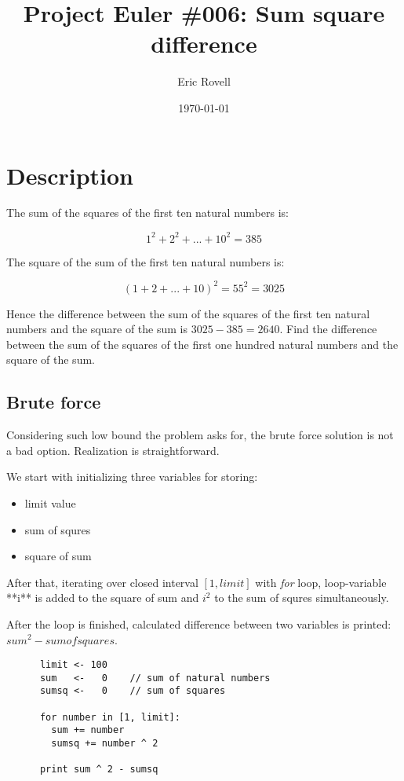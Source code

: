 \documentclass[14pt]{article}
\begin{document}
  
  \title{Project Euler \#006: Sum square difference}
  \author{Eric Rovell}
  \date{\today}
  \maketitle

  \tableofcontents

  \section{Description}

    The sum of the squares of the first ten natural numbers is:

    $$1^2 + 2^2 + ... + 10^2 = 385$$
    
    The square of the sum of the first ten natural numbers is:
    
    $$(1 + 2 + ... + 10)^2 = 55^2 = 3025$$
    
    Hence the difference between the sum of the squares of the first ten natural numbers and the square of the sum is $3025 − 385 = 2640$. Find the difference between the sum of the squares of the first one hundred natural numbers and the square of the sum.

  \subsection{Brute force}

    Considering such low bound the problem asks for, the brute force solution is not a bad option. Realization is straightforward.

    We start with initializing three variables for storing:
    
    \begin{itemize}
      \item limit value
      \item sum of squres
      \item square of sum
    \end{itemize}
        
    After that, iterating over closed interval $[1, limit]$ with \textit{for} loop, loop-variable **i** is added to the square of sum and $\mathit{i ^ 2}$ to the sum of squres simultaneously.
    
    After the loop is finished, calculated difference between two variables is printed: $\mathit{sum ^ 2 - sum of squares}$.

    \begin{verbatim}
      limit <- 100
      sum   <-   0    // sum of natural numbers
      sumsq <-   0    // sum of squares

      for number in [1, limit]:
        sum += number
        sumsq += number ^ 2

      print sum ^ 2 - sumsq
    \end{verbatim}
\end{document}
